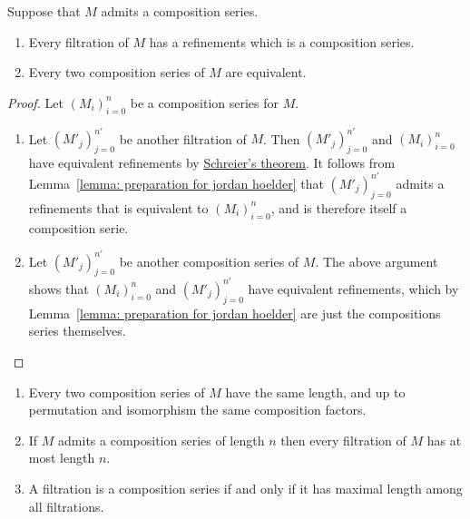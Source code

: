 \begin{theorem}
  \label{theorem: jordan hoelder theorem}
  Suppose that $M$ admits a composition series.
  \begin{enumerate}
    \item
      Every filtration of $M$ has a refinements which is a composition series.
    \item
      Every two composition series of $M$ are equivalent.
  \end{enumerate}
\end{theorem}


\begin{proof}
  Let $(M_i)_{i=0}^n$ be a composition series for $M$.
  \begin{enumerate}
    \item
      Let $(M'_j)_{j=0}^{n'}$ be another filtration of $M$.
      Then $(M'_j)_{j=0}^{n'}$ and $(M_i)_{i=0}^n$ have equivalent refinements by \hyperref[theorem: Schreiers theorem]{Schreier’s theorem}.
      It follows from Lemma~\ref{lemma: preparation for jordan hoelder} that $(M'_j)_{j=0}^{n'}$ admits a refinements that is equivalent to $(M_i)_{i=0}^n$, and is therefore itself a composition serie.
    \item
      Let $(M'_j)_{j=0}^{n'}$ be another composition series of $M$.
      The above argument shows that $(M_i)_{i=0}^n$ and $(M'_j)_{j=0}^{n'}$ have equivalent refinements, which by Lemma~\ref{lemma: preparation for jordan hoelder} are just the compositions series themselves.
    \qedhere
  \end{enumerate}
\end{proof}


\begin{corollary}
  \label{corollary: consequences of jordan hoelder}
  \leavevmode
  \begin{enumerate}
    \item
      \label{enumerate: composition series have same length and factors}
      Every two composition series of $M$ have the same length, and up to permutation and isomorphism the same composition factors.
    \item
      \label{enumerate: filtration maximal length of composition series}
      If $M$ admits a composition series of length $n$ then every filtration of $M$ has at most length $n$.
    \item
      A filtration is a composition series if and only if it has maximal length among all filtrations.
  \end{enumerate}
\end{corollary}


